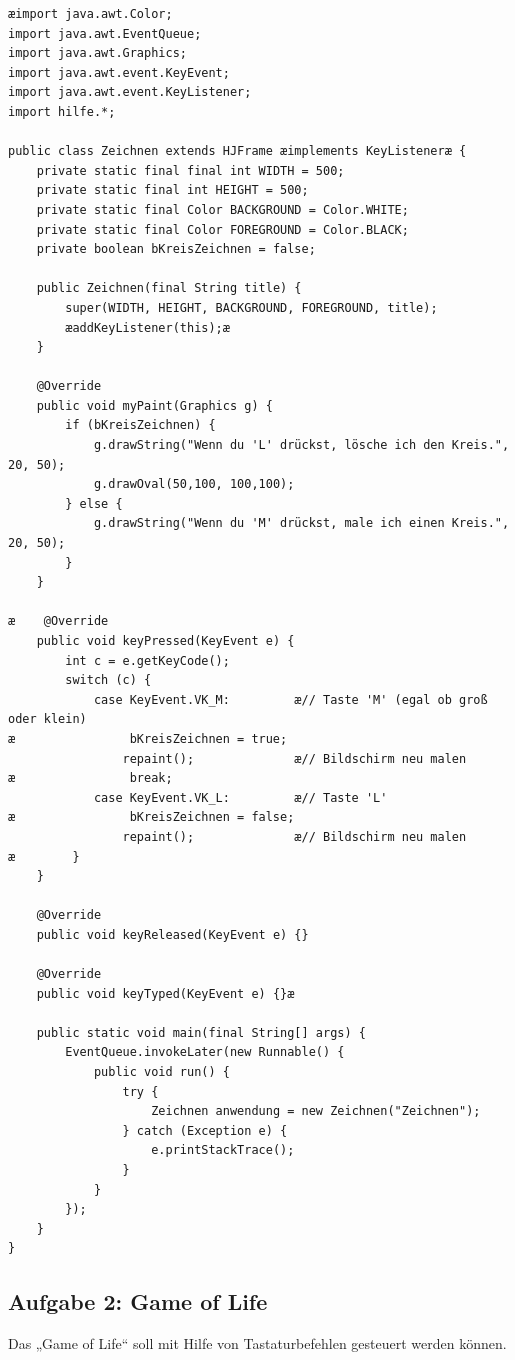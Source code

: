 \begin{lstlisting}
æimport java.awt.Color;
import java.awt.EventQueue;
import java.awt.Graphics;
import java.awt.event.KeyEvent;
import java.awt.event.KeyListener;
import hilfe.*;

public class Zeichnen extends HJFrame æimplements KeyListeneræ {
    private static final final int WIDTH = 500;
    private static final int HEIGHT = 500;
    private static final Color BACKGROUND = Color.WHITE;
    private static final Color FOREGROUND = Color.BLACK;
    private boolean bKreisZeichnen = false;

    public Zeichnen(final String title) {
        super(WIDTH, HEIGHT, BACKGROUND, FOREGROUND, title);
        æaddKeyListener(this);æ
    }

    @Override
    public void myPaint(Graphics g) {
        if (bKreisZeichnen) {
            g.drawString("Wenn du 'L' drückst, lösche ich den Kreis.", 20, 50);
            g.drawOval(50,100, 100,100);
        } else {
            g.drawString("Wenn du 'M' drückst, male ich einen Kreis.", 20, 50);
        }
    }

æ    @Override
    public void keyPressed(KeyEvent e) { 
        int c = e.getKeyCode();
        switch (c) {
            case KeyEvent.VK_M:         æ// Taste 'M' (egal ob groß oder klein)
æ                bKreisZeichnen = true;
                repaint();              æ// Bildschirm neu malen
æ                break;
            case KeyEvent.VK_L:         æ// Taste 'L'
æ                bKreisZeichnen = false;
                repaint();              æ// Bildschirm neu malen
æ        }
    }

    @Override
    public void keyReleased(KeyEvent e) {}

    @Override
    public void keyTyped(KeyEvent e) {}æ

    public static void main(final String[] args) {
        EventQueue.invokeLater(new Runnable() {
            public void run() {
                try {
                    Zeichnen anwendung = new Zeichnen("Zeichnen");
                } catch (Exception e) {
                    e.printStackTrace();
                }
            }
        });
    }
}
\end{lstlisting}


\subsection{Aufgabe 2: Game of Life}

Das „Game of Life“ soll mit Hilfe von Tastaturbefehlen gesteuert werden können.

